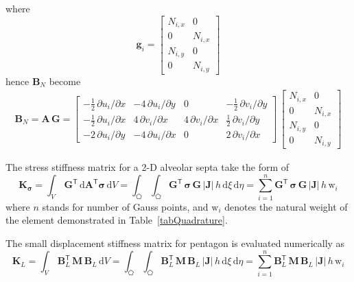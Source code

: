 where 
\begin{equation}
\mathbf{g}_i = \begin{bmatrix}
N_{i,x} &  0 \\
0 & N_{i,x} \\
N_{i,y} & 0 \\
0 & N_{i,y} \end{bmatrix} 
\end{equation}
hence $\mathbf{B}_N$ become
\begin{equation}
\begin{aligned}
\mathbf{B}_{N}  =  \mathbf{A} \, \mathbf{G} = \begin{bmatrix}
-\frac{1}{2} \, \partial u_i / \partial x &  -4 \, \partial u_i / \partial y & 0 & -\frac{1}{2} \, \partial v_i / \partial y \\
-\frac{1}{2} \, \partial u_i / \partial x &  4 \, \partial v_i / \partial x & 4 \, \partial v_i / \partial x & \frac{1}{2} \, \partial v_i / \partial y \\
-2 \, \partial u_i / \partial y &  -4 \, \partial u_i / \partial x & 0 & 2 \, \partial v_i / \partial x \end{bmatrix}  \, \begin{bmatrix}
N_{i,x} &  0 \\
0 & N_{i,x} \\
N_{i,y} & 0 \\
0 & N_{i,y} \end{bmatrix} 
\end{aligned}
\end{equation}

The stress stiffness matrix for a 2-D alveolar septa take the form of
\begin{equation}
\mathbf{K}_{\boldsymbol{\sigma}} = \int_{V} \, \mathbf{G}^{\mathsf{T}} \, \mathrm{d} \mathbf{A}^{\mathsf{T}} \boldsymbol{\sigma} \, \mathrm{d} V
= \int_{\pentagon} \int_{\pentagon} \mathbf{G}^{\mathsf{T}} \,  \boldsymbol{\sigma} \, \mathbf{G} \, |\mathbf{J}|  \, h \,  \mathrm{d} \xi \,  \mathrm{d} \eta =  \sum_{i=1}^{n}  \mathbf{G}^{\mathsf{T}} \,  \boldsymbol{\sigma} \, \mathbf{G} \, |\mathbf{J}| \, h \, \mathrm{w}_i
\end{equation}
where $n$ stands for number of Gauss points, and $\mathrm{w}_i$ denotes the natural weight of the element demonstrated in Table~\ref{tabQuadrature}.

The small displacement stiffness matrix for pentagon is evaluated numerically as 
\begin{equation}
\mathbf{K}_{L} = \int_{V} \, \mathbf{B}_L^{\mathsf{T}} \, \mathbf{M} \, \mathbf{B}_L \, \mathrm{d} V  = \int_{\pentagon} \int_{\pentagon} \mathbf{B}_L^{\mathsf{T}} \, \mathbf{M} \, \mathbf{B}_L \, |\mathbf{J}| \, h \,  \mathrm{d} \xi \,  \mathrm{d} \eta =  \sum_{i=1}^{n}  \mathbf{B}_L^{\mathsf{T}} \, \mathbf{M} \, \mathbf{B}_L \, |\mathbf{J}|  \, h \, \mathrm{w}_i
\end{equation}

